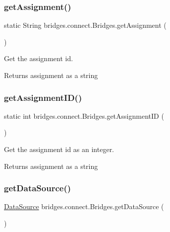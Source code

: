\subsubsection{\texorpdfstring{get\+Assignment()}{getAssignment()}}
{\footnotesize\ttfamily static String bridges.\+connect.\+Bridges.\+get\+Assignment (\begin{DoxyParamCaption}{ }\end{DoxyParamCaption})\hspace{0.3cm}{\ttfamily [static]}}



Get the assignment id. 

\begin{DoxyReturn}{Returns}
assignment as a string 
\end{DoxyReturn}
\mbox{\label{classbridges_1_1connect_1_1_bridges_ac13ed456687540b57c138adb11735d95}} 
\subsubsection{\texorpdfstring{get\+Assignment\+I\+D()}{getAssignmentID()}}
{\footnotesize\ttfamily static int bridges.\+connect.\+Bridges.\+get\+Assignment\+ID (\begin{DoxyParamCaption}{ }\end{DoxyParamCaption})\hspace{0.3cm}{\ttfamily [static]}}



Get the assignment id as an integer. 

\begin{DoxyReturn}{Returns}
assignment as a string 
\end{DoxyReturn}
\mbox{\label{classbridges_1_1connect_1_1_bridges_acfe00a832969a77504d9d33d783c4fcd}} 
\subsubsection{\texorpdfstring{get\+Data\+Source()}{getDataSource()}}
{\footnotesize\ttfamily \hyperlink{classbridges_1_1connect_1_1_data_source}{Data\+Source} bridges.\+connect.\+Bridges.\+get\+Data\+Source (\begin{DoxyParamCaption}{ }\end{DoxyParamCaption})}



